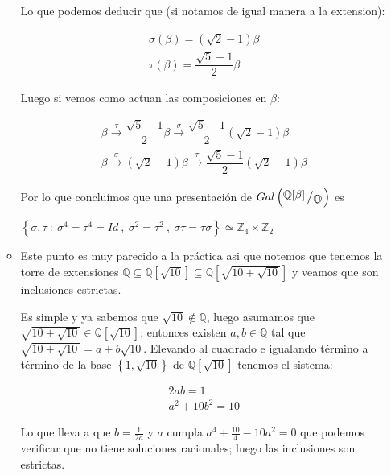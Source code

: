 \documentclass[11pt]{article}
\newcommand{\Q}{\mathbb{Q}}
\newcommand{\Z}{\mathbb{Z}}
\newcommand\tq{~:~}
\newcommand{\sett}[1]{\left\lbrace#1\right\rbrace}
\newcommand{\quotient}[2]{{\raisebox{.2em}{$#1$}\left/\raisebox{-.2em}{$#2$}\right.}}
\numberwithin{theorem}{subsection}
\begin{document}
\begin{enumerate}
\begin{itemize}
		Lo que podemos deducir que (si notamos de igual manera a la extension):
		
		\begin{equation*}
			\begin{aligned}
				\sigma(\beta) = \left(\sqrt{2} - 1\right)\beta \\
				\tau(\beta) = \dfrac{\sqrt{5} - 1}{2} \beta
			\end{aligned}
		\end{equation*}
		
		Luego si vemos como actuan las composiciones en $\beta$:
		
		\begin{equation*}
			\begin{aligned}
				\beta \xrightarrow{\tau} \dfrac{\sqrt{5} - 1}{2} \beta \xrightarrow{\sigma} \dfrac{\sqrt{5} - 1}{2}\left(\sqrt{2} - 1\right)\beta \\
				\beta \xrightarrow{\sigma} \left(\sqrt{2} - 1\right)\beta \xrightarrow{\tau} \dfrac{\sqrt{5} - 1}{2}\left(\sqrt{2} - 1\right)\beta 
			\end{aligned}
		\end{equation*}
		
		Por lo que conclu\'imos que una presentaci\'on de $Gal\left(\quotient{\Q[\beta]}{\Q}\right)$ es
		
		 $\sett{\sigma, \tau \tq \sigma^4 = \tau^4 = Id \ , \ \sigma^2 = \tau^2 \ , \ \sigma\tau = \tau\sigma } \simeq \Z_4 \times \Z_2$
		
		\item Este punto es muy parecido a la pr\'actica asi que notemos que tenemos la torre de extensiones $\Q \subseteq \Q[\sqrt{10}] \subseteq \Q[\sqrt{10 + \sqrt{10}}]$ y veamos que son inclusiones estrictas.
		
		Es simple y ya sabemos que $\sqrt{10} \not \in \Q$, luego asumamos que $\sqrt{10 + \sqrt{10}} \in \Q[\sqrt{10}] $; entonces existen $a,b \in \Q$ tal que $\sqrt{10 + \sqrt{10}} = a + b \sqrt{10}$. Elevando al cuadrado e igualando t\'ermino a t\'ermino de la base $\sett{1, \sqrt{10}}$ de $\Q[\sqrt{10}]$ tenemos el sistema:
		
		\begin{equation*}
			\begin{aligned}
				2ab = 1 \\
				a^2 + 10b^2 = 10
			\end{aligned}
		\end{equation*}
		
		Lo que lleva a que $b = \frac{1}{2a}$ y $a$ cumpla $a^4 + \frac{10}{4}-10a^2 =0$ que podemos verificar que no tiene soluciones racionales; luego las inclusiones son estrictas.
		

\end{itemize}
\end{enumerate}
\end{document}
